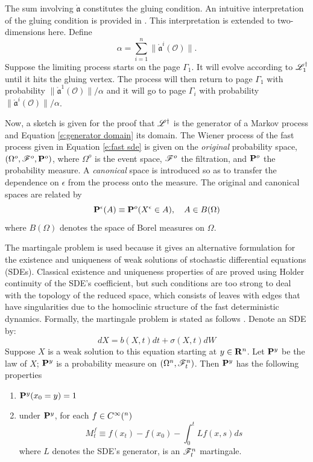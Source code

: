 The sum involving $\mathring{\mathfrak a}$ constitutes the gluing condition. An intuitive interpretation of the gluing condition is provided in \citet{namachchivaya01:_unified_approac_noisy_nonlin_mathieu_type_system}. This interpretation is extended to two-dimensions here. Define
\[
\alpha = \sum_{i=1}^n \lVert \mathring{\mathfrak a}^i(\mathcal{O}) \rVert.
\]
Suppose the limiting process starts on the page $\Gamma_1$. It will evolve according to $\mathscr L_1^\dagger$ until it hits the gluing vertex. The process will then return to page $\Gamma_1$ with probability $\lVert \mathring{\mathfrak a}^1(\mathcal{O}) \rVert/\alpha$ and it will go to page $\Gamma_i$ with probability $\lVert \mathring{\mathfrak a}^i(\mathcal{O}) \rVert/\alpha$.

Now, a sketch is given for the proof that $\mathscr L^\dagger$ is the generator of a Markov process and Equation \eqref{e:generator domain} its domain.
The Wiener process of the fast process given in Equation \eqref{e:fast sde} is given on the \emph{original} probability space, $(\Omega^o,\mathscr F^o,\mathbf P^o)$, where $\Omega^o$ is the event space, $\mathscr F^o$ the filtration, and $\mathbf P^o$ the probability measure. A \emph{canonical} space is introduced so as to transfer the dependence on $\epsilon$ from the process onto the measure. The original and canonical spaces are related by
\[
\mathbf P^\epsilon(A) \equiv \mathbf P^o(X^\epsilon \in A), \quad A \in B(\Omega)
\]
where $B(\Omega)$ denotes the space of Borel measures on $\Omega$.

The martingale problem is used because it gives an alternative formulation for the existence and uniqueness of weak solutions of stochastic differential equations (SDEs). Classical existence and uniqueness properties of are proved using Holder continuity of the SDE's coefficient, but such conditions are too strong to deal with the topology of the reduced space, which consists of leaves with edges that have singularities due to the homoclinic structure of the fast deterministic dynamics. Formally, the martingale problem is stated as follows \citep{rogers00:_diffus_markov}. Denote an SDE by:
\[
dX = b(X,t) dt + \sigma(X,t) dW
\]
Suppose $X$ is a weak solution to this equation starting at $y \in \mathbf R^n$. Let $\mathbf P^y$ be the law of $X$; $\mathbf P^y$ is a probability measure on $(\Omega^n,\mathscr F_t^n)$. Then $\mathbf P^y$ has the following properties
\begin{enumerate}
\item $\mathbf P^y(x_0 = y) = 1$
\item under $\mathbf P^y$, for each $f \in C^\infty(\real^n)$
\[
M_t^f \equiv f(x_t) - f(x_0) - \int_0^t L f(x,s) ds
\]
where $L$ denotes the SDE's generator, is an $\mathscr F_t^n$ martingale.
\end{enumerate}

